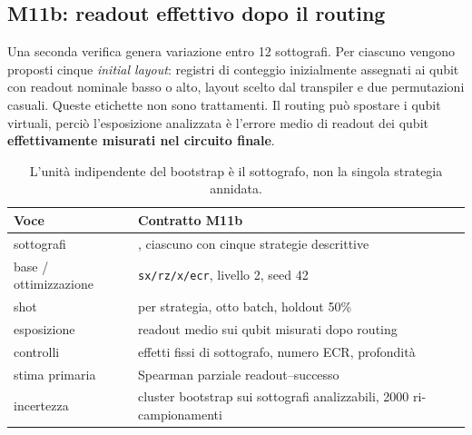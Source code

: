 \begin{onehalfspace}
\subsection{M11b: readout effettivo dopo il routing}
\label{sec:app_comp_ruoli}

Una seconda verifica genera variazione entro 12 sottografi. Per ciascuno vengono proposti cinque \emph{initial layout}: registri di conteggio inizialmente assegnati ai qubit con readout nominale basso o alto, layout scelto dal transpiler e due permutazioni casuali. Queste etichette non sono trattamenti. Il routing pu\`o spostare i qubit virtuali, perci\`o l'esposizione analizzata \`e l'errore medio di readout dei qubit \textbf{effettivamente misurati nel circuito finale}.

\begin{table}[H]

\centering
\small
\begin{tabular}{>{\raggedright\arraybackslash}p{}>{\raggedright\arraybackslash}p{}}
\toprule
\textbf{Voce} & \textbf{Contratto M11b} \\
\midrule
sottografi & 12, ciascuno con cinque strategie descrittive \\
\addlinespace[0.3em]
base / ottimizzazione & \texttt{sx/rz/x/ecr}, livello 2, seed 42 \\
\addlinespace[0.3em]
shot & 8192 per strategia, otto batch, holdout 50\% \\
\addlinespace[0.3em]
esposizione & readout medio sui qubit misurati dopo routing \\
\addlinespace[0.3em]
controlli & effetti fissi di sottografo, numero ECR, profondit\`a \\
\addlinespace[0.3em]
stima primaria & Spearman parziale readout--successo \\
\addlinespace[0.3em]
incertezza & cluster bootstrap sui sottografi analizzabili, 2000 ri-campionamenti \\
\bottomrule
\end{tabular}
\caption[Disegno osservazionale M11b]{L'unit\`a indipendente del bootstrap \`e il sottografo, non la singola strategia annidata.}\label{tab:app_comp_ruoli}

\end{table}

\begin{table}[H]


\end{table}
\end{onehalfspace}

